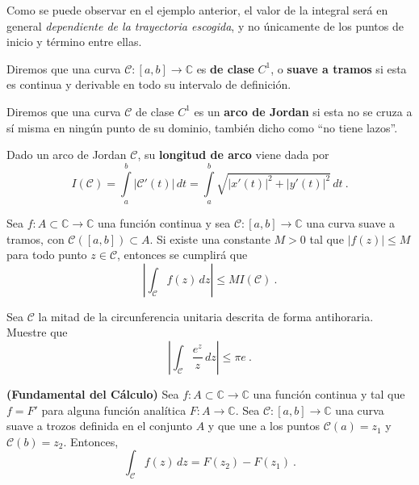 Como se puede observar en el ejemplo anterior, el valor de la integral será en general \emph{dependiente de la trayectoria escogida}, y no únicamente de los puntos de inicio y término entre ellas.

\begin{defi}
    Diremos que una curva $\mathcal{C}: [a,b] \to \mathbb{C}$ es \textbf{de clase} $C^1$, o \textbf{suave a tramos} si esta es continua y derivable en todo su intervalo de definición.
\end{defi}

\begin{defi}
    Diremos que una curva $\mathcal{C}$ de clase $C^1$ es un \textbf{arco de Jordan} si esta no se cruza a sí misma en ningún punto de su dominio, también dicho como ``no tiene lazos''.
\end{defi}

\begin{defi}
    Dado un arco de Jordan $\mathcal{C}$, su \textbf{longitud de arco} viene dada por 
    \begin{equation}
        I(\mathcal{C}) = \int\limits_a^b |\mathcal{C}'(t)| \, dt = \int\limits_a^b \sqrt{|x'(t)|^2 + |y'(t)|^2} \, dt \ .
    \end{equation}
\end{defi}

\begin{teorema}
    Sea $f: A \subset \mathbb{C} \to \mathbb{C}$ una función continua y sea $\mathcal{C}: [a,b] \to \mathbb{C}$ una curva suave a tramos, con $\mathcal{C}([a,b]) \subset A$. Si existe una constante $M > 0$ tal que $|f(z)| \leq M$ para todo punto $z \in \mathcal{C}$, entonces se cumplirá que
    \begin{equation}
        \left| \int_\mathcal{C} f(z) \, dz \right| \leq M I(\mathcal{C}) \ .
    \end{equation}
\end{teorema}

\begin{ejemplo}
    Sea $\mathcal{C}$ la mitad de la circunferencia unitaria descrita de forma antihoraria. Muestre que 
    \begin{equation*}
        \left| \int_\mathcal{C} \frac{e^z}{z} \, dz \right| \leq \pi e \ .
    \end{equation*}
\end{ejemplo}

\begin{teorema}{\textbf{(Fundamental del Cálculo)}}
    Sea $f: A \subset \mathbb{C} \to \mathbb{C}$ una función continua y tal que $f = F'$ para alguna función analítica $F: A \to \mathbb{C}$. Sea $\mathcal{C}: [a,b] \to \mathbb{C}$ una curva suave a trozos definida en el conjunto $A$ y que une a los puntos $\mathcal{C}(a) = z_1$ y $\mathcal{C}(b) = z_2$. Entonces,
    \begin{equation}
        \int_\mathcal{C} f(z) \, dz = F(z_2) - F(z_1) \ .
    \end{equation}
\end{teorema}

